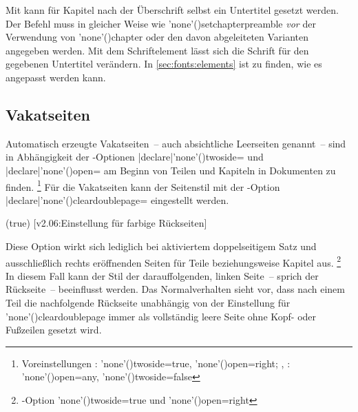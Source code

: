 \begin{DeclareEntity*}{}
\begin{DeclareEntity*}{}
\begin{DeclareEntity*}{}
\begin{Declaration}
\begin{Declaration}
Mit  kann für Kapitel nach 
der Überschrift selbst ein Untertitel gesetzt werden. Der Befehl muss in 
gleicher Weise wie \Macro'none'(){setchapterpreamble} 
\emph{vor} der Verwendung von \Macro'none'(){chapter} oder 
den davon abgeleiteten Varianten angegeben werden. Mit dem Schriftelement 
 lässt sich die Schrift für den gegebenen Untertitel 
verändern. In \autoref{sec:fonts:elements} ist zu finden, wie es angepasst 
werden kann.
\end{Declaration}
\end{Declaration}
%
%



\subsection{%
  Vakatseiten%
  \label{sec:vacat}%
}

Automatisch erzeugte Vakatseiten~-- auch absichtliche Leerseiten genannt~-- 
sind in Abhängigkeit der 
\KOMAScript-Optionen \Option|declare|'none'(){twoside=\PMisc} 
und \Option|declare|'none'(){open=} am 
Beginn von Teilen und Kapiteln in Dokumenten zu finden.%
\footnote{%
  Voreinstellungen
  : 
  \Option'none'(){twoside=true}, 
  \Option'none'(){open=right};
  , : 
  \Option'none'(){open=any}, 
  \Option'none'(){twoside=false}%
}
Für die Vakatseiten kann der Seitenstil mit der \KOMAScript-Option 
\Option|declare|'none'(){cleardoublepage=\PMisc} 
eingestellt werden.

\begin{Declaration}
  {}
  (true)
  [v2.06:Einstellung für farbige Rückseiten]

Diese Option wirkt sich lediglich bei aktiviertem doppelseitigem Satz und 
ausschließlich rechts eröffnenden Seiten für Teile beziehungsweise Kapitel
aus.%
\footnote{%
  \KOMAScript-Option \Option'none'(){twoside=true} und 
  \Option'none'(){open=right}%
}
In diesem Fall kann der Stil der darauffolgenden, linken Seite~-- sprich der 
Rückseite~-- beeinflusst werden. Das Normalverhalten sieht vor, dass nach einem 
Teil die nachfolgende Rückseite unabhängig von der Einstellung für 
\Option'none'(){cleardoublepage} immer als vollständig 
leere Seite ohne Kopf- oder Fußzeilen gesetzt wird.


\end{Declaration}
\end{DeclareEntity*}
\end{DeclareEntity*}
\end{DeclareEntity*}
